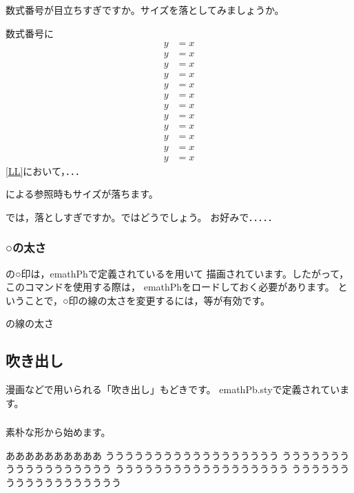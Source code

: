 数式番号が目立ちすぎですか。サイズを落としてみましょうか。

\begin{showEx}{数式番号に}
\def\tagform#1{%
  \footnotesize\emPmaru{#1}}
\begin{align}
  y &= x\\
  y &= x\\
  y &= x\\
  y &= x\\
  y &= x\\
  y &= x\\
  y &= x\\
  y &= x\\
  y &= x\\
  y &= x\\
  y &= x\label{LL}\\
  y &= x
\end{align}
\eqref{LL}において，．．．
\end{showEx}

による参照時もサイズが落ちます。

では，落としすぎですか。ではどうでしょう。
お好みで．．．．．

\subsubsection{○の太さ}
の○印は，\textsf{emathPh}で定義されているを用いて
描画されています。したがって，このコマンドを使用する際は，
\textsf{emathPh}をロードしておく必要があります。
ということで，○印の線の太さを変更するには，等が有効です。
\begin{showEx}{の線の太さ}
\hspace{1\zw}%
\thicklines{}
\end{showEx}

\subsection{吹き出し}
漫画などで用いられる「吹き出し」もどきです。
\textsf{emathPb.sty}で定義されています。

\subsubsection{}
素朴な形から始めます。

\begin{showEx}{}
ああああああああああ%
%
うううううううううううううううううう
うううううううううううううううううう
うううううううううううううううううう
うううううううううううううううううう
\end{showEx}

